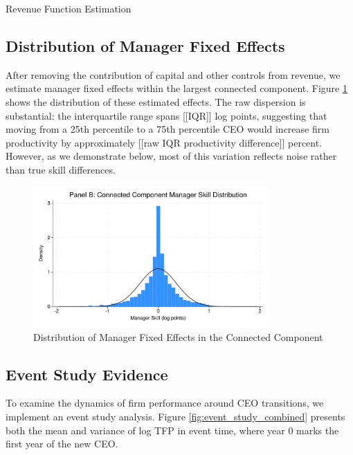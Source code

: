 \documentclass[11pt,a4paper]{article}
\begin{document}
\begin{table}[htbp]
\centering
\caption{Revenue Function Estimation}
\label{tab:revenue_function}

\end{table}

\subsection{Distribution of Manager Fixed Effects}

After removing the contribution of capital and other controls from revenue, we estimate manager fixed effects within the largest connected component. Figure \ref{fig:manager_distribution} shows the distribution of these estimated effects. The raw dispersion is substantial: the interquartile range spans [[IQR]] log points, suggesting that moving from a 25th percentile to a 75th percentile CEO would increase firm productivity by approximately [[raw IQR productivity difference]] percent. However, as we demonstrate below, most of this variation reflects noise rather than true skill differences.

\begin{figure}[htbp]
\centering
\includegraphics[width=0.8\textwidth]{figure/manager_skill_connected.pdf}
\caption{Distribution of Manager Fixed Effects in the Connected Component}
\label{fig:manager_distribution}
\end{figure}

\subsection{Event Study Evidence}

To examine the dynamics of firm performance around CEO transitions, we implement an event study analysis. Figure \ref{fig:event_study_combined} presents both the mean and variance of log TFP in event time, where year 0 marks the first year of the new CEO.
\end{document}
